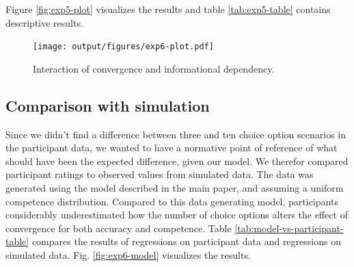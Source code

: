 \documentclass[
  doc,floatsintext]{apa6}
\begin{document}
Figure \ref{fig:exp5-plot} visualizes the results and table \ref{tab:exp5-table} contains descriptive results.

\begin{table}

\caption{\label{tab:exp6-table}}
\centering
{}
\end{table}



\begin{figure}
\centering
\texttt{[image: output/figures/exp6-plot.pdf]}
\caption{\label{fig:exp6-plot}Interaction of convergence and informational dependency.}
\end{figure}

\subsection{Comparison with simulation}\label{comparison-with-simulation-1}

Since we didn't find a difference between three and ten choice option scenarios in the participant data, we wanted to have a normative point of reference of what should have been the expected difference, given our model. We therefor compared participant ratings to observed values from simulated data. The data was generated using the model described in the main paper, and assuming a uniform competence distribution. Compared to this data generating model, participants considerably underestimated how the number of choice options alters the effect of convergence for both accuracy and competence. Table \ref{tab:model-vs-participant-table} compares the results of regressions on participant data and regressions on simulated data. Fig. \ref{fig:exp6-model} visualizes the results.
\end{document}
